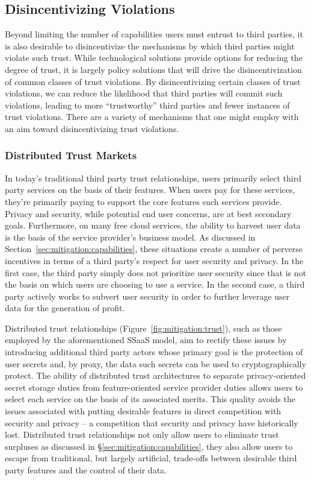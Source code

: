 \subsection{Disincentivizing Violations}
\label{sec:mitigation:violations}

Beyond limiting the number of capabilities users must entrust to third
parties, it is also desirable to disincentivize the mechanisms by
which third parties might violate such trust.  While technological
solutions provide options for reducing the degree of trust, it is
largely policy solutions that will drive the disincentivization of
common classes of trust violations. By disincentivizing certain
classes of trust violations, we can reduce the likelihood that third
parties will commit such violations, leading to more ``trustworthy''
third parties and fewer instances of trust violations. There are a
variety of mechanisms that one might employ with an aim toward
disincentivizing trust violations.

\subsubsection{Distributed Trust Markets}

In today's traditional third party trust relationships, users
primarily select third party services on the basis of their
features. When users pay for these services, they're primarily paying
to support the core features such services provide. Privacy and
security, while potential end user concerns, are at best secondary
goals. Furthermore, on many free cloud services, the ability to
harvest user data is the basis of the service provider's business
model. As discussed in Section~\ref{sec:mitigation:capabilities},
these situations create a number of perverse incentives in terms of a
third party's respect for user security and privacy. In the first
case, the third party simply does not prioritize user security since
that is not the basis on which users are choosing to use a service. In
the second case, a third party actively works to subvert user security
in order to further leverage user data for the generation of profit.

Distributed trust relationships (Figure~\ref{fig:mitigation:trust}),
such as those employed by the aforementioned SSaaS model, aim to
rectify these issues by introducing additional third party actors
whose primary goal is the protection of user secrets and, by proxy,
the data such secrets can be used to cryptographically protect. The
ability of distributed trust architectures to separate
privacy-oriented secret storage duties from feature-oriented service
provider duties allows users to select each service on the basis of
its associated merits. This quality avoids the issues associated with
putting desirable features in direct competition with security and
privacy -- a competition that security and privacy have historically
lost. Distributed trust relationships not only allow users to
eliminate trust surpluses as discussed in
\S\ref{sec:mitigation:capabilities}, they also allow users to escape
from traditional, but largely artificial, trade-offs between desirable
third party features and the control of their data.

